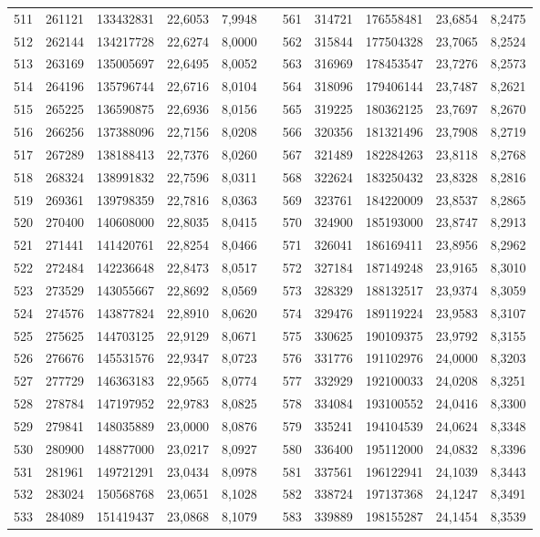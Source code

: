 \begin{longtable}{rrrrrrrrrrr}
511&261121&133432831&22,6053&7,9948&&561&314721&176558481&23,6854&8,2475\\
512&262144&134217728&22,6274&8,0000&&562&315844&177504328&23,7065&8,2524\\
513&263169&135005697&22,6495&8,0052&&563&316969&178453547&23,7276&8,2573\\
514&264196&135796744&22,6716&8,0104&&564&318096&179406144&23,7487&8,2621\\
515&265225&136590875&22,6936&8,0156&&565&319225&180362125&23,7697&8,2670\\
516&266256&137388096&22,7156&8,0208&&566&320356&181321496&23,7908&8,2719\\
517&267289&138188413&22,7376&8,0260&&567&321489&182284263&23,8118&8,2768\\
518&268324&138991832&22,7596&8,0311&&568&322624&183250432&23,8328&8,2816\\
519&269361&139798359&22,7816&8,0363&&569&323761&184220009&23,8537&8,2865\\
520&270400&140608000&22,8035&8,0415&&570&324900&185193000&23,8747&8,2913\\
521&271441&141420761&22,8254&8,0466&&571&326041&186169411&23,8956&8,2962\\
522&272484&142236648&22,8473&8,0517&&572&327184&187149248&23,9165&8,3010\\
523&273529&143055667&22,8692&8,0569&&573&328329&188132517&23,9374&8,3059\\
524&274576&143877824&22,8910&8,0620&&574&329476&189119224&23,9583&8,3107\\
525&275625&144703125&22,9129&8,0671&&575&330625&190109375&23,9792&8,3155\\
526&276676&145531576&22,9347&8,0723&&576&331776&191102976&24,0000&8,3203\\
527&277729&146363183&22,9565&8,0774&&577&332929&192100033&24,0208&8,3251\\
528&278784&147197952&22,9783&8,0825&&578&334084&193100552&24,0416&8,3300\\
529&279841&148035889&23,0000&8,0876&&579&335241&194104539&24,0624&8,3348\\
530&280900&148877000&23,0217&8,0927&&580&336400&195112000&24,0832&8,3396\\
531&281961&149721291&23,0434&8,0978&&581&337561&196122941&24,1039&8,3443\\
532&283024&150568768&23,0651&8,1028&&582&338724&197137368&24,1247&8,3491\\
533&284089&151419437&23,0868&8,1079&&583&339889&198155287&24,1454&8,3539\\

\end{longtable}
